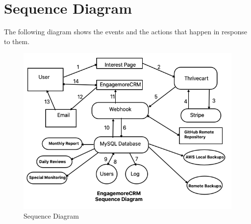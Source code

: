 \documentclass[final,letterpaper,12pt]{article}
\begin{document}
\section{Sequence Diagram}
\noindent The following diagram shows the events and the actions that happen in response to them.
\smallskip
\begin{figure}[ht]
\begin{center}
\includegraphics[width=6in]{EngagemoreCRM_Sequence.jpg}
\caption{\label{fig:sequence}Sequence Diagram}
\end{center}
\end{figure}
\end{document}
